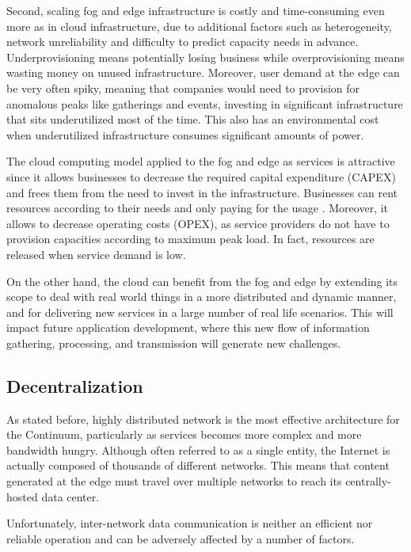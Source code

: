 \documentclass{ieeeaccess}
\begin{document}
Second, scaling fog and edge infrastructure is costly and time-consuming even more as in cloud infrastructure, due to additional factors such as heterogeneity, network unreliability and difficulty to predict capacity needs in advance. Underprovisioning means potentially losing business while overprovisioning means wasting money on unused infrastructure.  Moreover, user demand at the edge can be very often spiky, meaning that companies would need to provision for anomalous peaks like gatherings and events, investing in significant infrastructure that sits underutilized most of the time. This also has an environmental cost when underutilized infrastructure consumes significant amounts of power.

The cloud computing model applied to the fog and edge as services is attractive since it allows businesses to decrease the required capital expenditure (CAPEX) and frees them from the need to invest in the infrastructure. Businesses can rent resources according to their needs and only paying for the usage \cite{cloud-iot}. Moreover, it allows to decrease operating costs (OPEX), as service providers do not have to provision capacities according to maximum peak load. In fact, resources are released when service demand is low.

On the other hand, the cloud can benefit from the fog and edge by extending its scope to deal with real world things in a more distributed and dynamic manner, and for delivering new services in a large number of real life scenarios. This will impact future application development, where this new flow of information gathering, processing, and transmission will generate new challenges.

\subsection{Decentralization}

As stated before, highly distributed network is the most effective architecture for the Continuum, particularly as services becomes more complex and more bandwidth hungry. Although often referred to as a single entity, the Internet is actually composed of thousands of different networks. This means that content generated at the edge must travel over multiple networks to reach its centrally-hosted data center.

Unfortunately, inter-network data communication is neither an efficient nor reliable operation and can be adversely affected by a number of factors.
\end{document}
